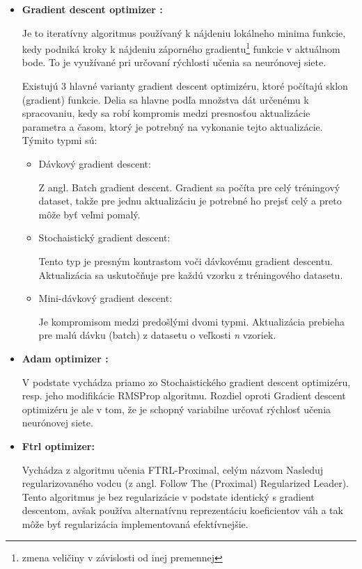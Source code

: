 \begin{itemize}
	\item \textbf{Gradient descent optimizer \cite{gradient_descent}:}
	
	Je to iteratívny algoritmus používaný k nájdeniu lokálneho minima funkcie, kedy podniká kroky k nájdeniu záporného gradientu\footnote{ zmena veličiny v závislosti od inej premennej} funkcie v aktuálnom bode. To je využívané pri určovaní rýchlosti učenia sa neurónovej siete. 
	
	Existujú 3 hlavné varianty gradient descent optimizéru, ktoré počítajú sklon (gradient) funkcie. Delia sa hlavne podľa množstva dát určenému k spracovaniu, kedy sa robí kompromis medzi presnosťou aktualizácie parametra a časom, ktorý je potrebný na vykonanie tejto aktualizácie. Týmito typmi sú:
	\begin{itemize}
		\item{Dávkový gradient descent:}
		
		Z angl. Batch gradient descent. Gradient sa počíta pre celý tréningový dataset, takže pre jednu aktualizáciu je potrebné ho prejsť celý a preto môže byť veľmi pomalý. 
		\item {Stochaistický gradient descent:}
		
		Tento typ je presným kontrastom voči dávkovému gradient descentu. Aktualizácia sa uskutočňuje pre každú vzorku z tréningového datasetu. 
		\item{Mini-dávkový gradient descent:}
		
		Je kompromisom medzi predošlými dvomi typmi. Aktualizácia prebieha pre malú dávku (batch) z datasetu o veľkosti \textit{n} vzoriek.
	\end{itemize} 
	\item \textbf{Adam optimizer \cite{adam}:}
	
	V podstate vychádza priamo zo Stochaistického gradient descent optimizéru, resp. jeho modifikácie RMSProp algoritmu\cite{rms}. Rozdiel oproti Gradient descent optimizéru je ale v tom, že je schopný variabilne určovať rýchlosť učenia neurónovej siete.
	
	\item \textbf{Ftrl optimizer:}
	
	Vychádza z algoritmu učenia FTRL-Proximal\cite{ftrl}, celým názvom Nasleduj regularizovaného vodcu (z angl. Follow The (Proximal) Regularized Leader). Tento algoritmus je bez regularizácie v podstate identický s gradient descentom, avšak používa alternatívnu reprezentáciu koeficientov váh a tak môže byť regularizácia implementovaná efektívnejšie.
\end{itemize}

